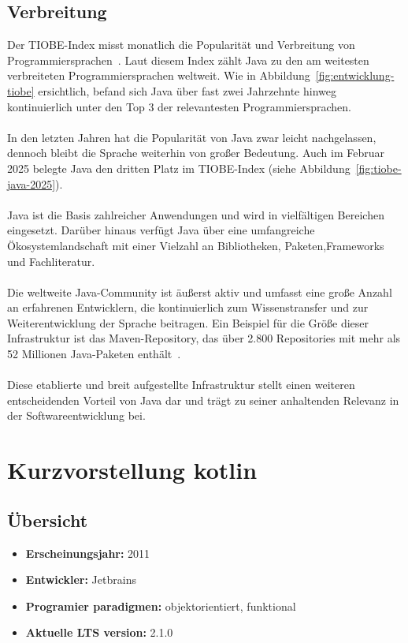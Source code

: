 \documentclass[11pt]{article}
\begin{document}
    \subsection{Verbreitung}
    Der TIOBE-Index misst monatlich die Popularität und Verbreitung von Programmiersprachen~\cite{tiobe}.
    Laut diesem Index zählt Java zu den am weitesten verbreiteten Programmiersprachen weltweit.
    Wie in Abbildung~\ref{fig:entwicklung-tiobe} ersichtlich, befand sich Java über fast zwei Jahrzehnte hinweg
    kontinuierlich unter den Top 3 der relevantesten Programmiersprachen.\\
    \\
    In den letzten Jahren hat die Popularität von Java zwar leicht nachgelassen, dennoch bleibt die Sprache weiterhin
    von großer Bedeutung.
    Auch im Februar 2025 belegte Java den dritten Platz im TIOBE-Index (siehe Abbildung~\ref{fig:tiobe-java-2025}).\\
    \\
    Java ist die Basis zahlreicher Anwendungen und wird in vielfältigen Bereichen eingesetzt.
    Darüber hinaus verfügt Java über eine umfangreiche Ökosystemlandschaft mit einer Vielzahl an Bibliotheken, Paketen,Frameworks und Fachliteratur.\\
    \\
    Die weltweite Java-Community ist äußerst aktiv und umfasst eine große Anzahl an erfahrenen Entwicklern, die kontinuierlich zum Wissenstransfer und zur Weiterentwicklung der Sprache beitragen.
    Ein Beispiel für die Größe dieser Infrastruktur ist das Maven-Repository, das über 2.800 Repositories mit mehr als 52 Millionen Java-Paketen enthält~\cite{maven}.\\
    \\
    Diese etablierte und breit aufgestellte Infrastruktur stellt einen weiteren entscheidenden Vorteil von Java dar und
    trägt zu seiner anhaltenden Relevanz in der Softwareentwicklung bei.\\

    \section{Kurzvorstellung kotlin}

    \subsection{Übersicht}
    \begin{itemize}
        \item \textbf{Erscheinungsjahr:} 2011
        \item \textbf{Entwickler:} Jetbrains
        \item \textbf{Programier paradigmen:} objektorientiert, funktional
        \item \textbf{Aktuelle LTS version:} 2.1.0
    \end{itemize}
\end{document}
